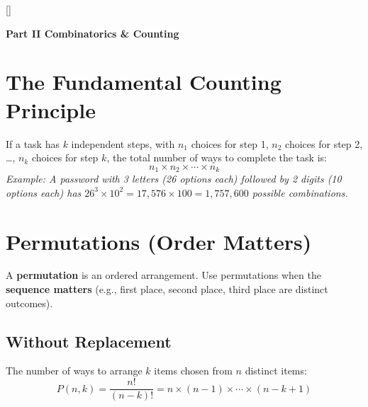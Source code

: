 \documentclass[11pt, letterpaper]{article}
\newcommand{\bluesections}{%
  \titleformat{\section}{\large\bfseries\color{sectionblue}}{}{0em}{}[\color{sectionblue}\titlerule]%
  \titleformat{\subsection}{\normalsize\bfseries\color{sectionblue!80!black}}{}{0em}{}%
}
\newcommand{\partbanner}[3]{%
  \begin{tcolorbox}[colback=#1, colframe=#2, boxrule=1.2pt, arc=4pt,
    left=8pt, right=8pt, top=6pt, bottom=6pt]
    \begin{center}{\LARGE\bfseries #3}\end{center}
  \end{tcolorbox}%
}
\begin{document}
\newpage

\bluesections
{}
\partbanner{partbg}{sectionblue}{Part II \quad Combinatorics \& Counting}

\vspace{8pt}

\section*{The Fundamental Counting Principle}

If a task has $k$ independent steps, with $n_1$ choices for step 1, $n_2$ choices for step 2, \ldots, $n_k$ choices for step $k$, the total number of ways to complete the task is:
\[
  n_1 \times n_2 \times \cdots \times n_k
\]
\textit{Example: A password with 3 letters (26 options each) followed by 2 digits (10 options each) has $26^3 \times 10^2 = 17{,}576 \times 100 = 1{,}757{,}600$ possible combinations.}

\section*{Permutations (Order Matters)}

A \textbf{permutation} is an ordered arrangement. Use permutations when the \textbf{sequence matters} (e.g., first place, second place, third place are distinct outcomes).

\subsection*{Without Replacement}
The number of ways to arrange $k$ items chosen from $n$ distinct items:
\[
  P(n, k) = \frac{n!}{(n-k)!} = n \times (n-1) \times \cdots \times (n-k+1)
\]
\end{document}
